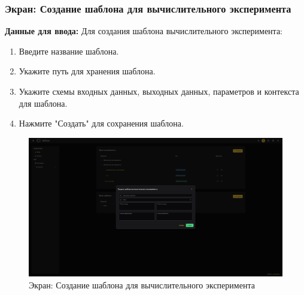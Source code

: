 \documentclass[a4paper,12pt,reqno]{article}
\begin{document}
\subsubsection{Экран: Создание шаблона для вычислительного эксперимента}
\textbf{Данные для ввода:}
Для создания шаблона вычислительного эксперимента:
\begin{enumerate}
    \item Введите название шаблона.
    \item Укажите путь для хранения шаблона.
    \item Укажите схемы входных данных, выходных данных, параметров и контекста для шаблона.
    \item Нажмите "Создать" для сохранения шаблона.
\end{enumerate}
\begin{figure}[H]
    \centering
    \includegraphics[width=\textwidth]{RO/img/create_template.png} %
    \caption{Экран: Создание шаблона для вычислительного эксперимента}
    \label{fig:create_template}
\end{figure}
\end{document}

